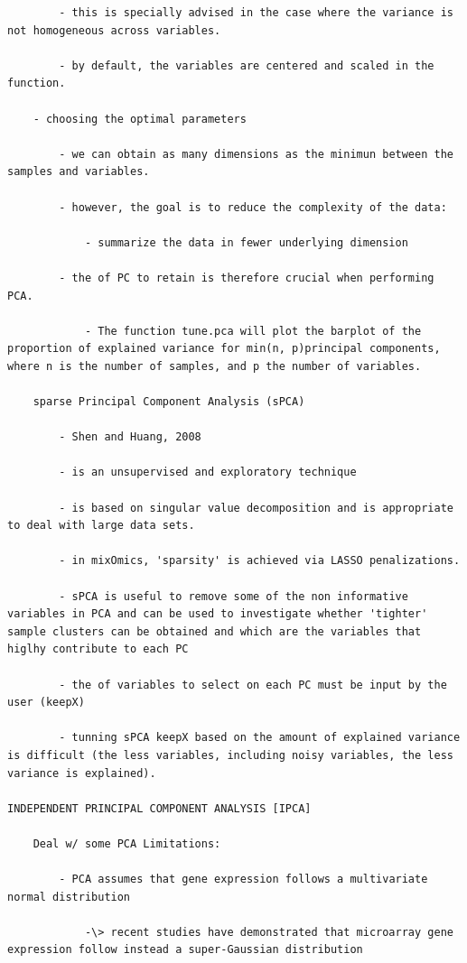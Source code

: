 \documentclass[
]{book}
\begin{document}
\begin{verbatim}
        - this is specially advised in the case where the variance is not homogeneous across variables.

        - by default, the variables are centered and scaled in the function.

    - choosing the optimal parameters

        - we can obtain as many dimensions as the minimun between the samples and variables.

        - however, the goal is to reduce the complexity of the data:

            - summarize the data in fewer underlying dimension

        - the of PC to retain is therefore crucial when performing PCA.

            - The function tune.pca will plot the barplot of the proportion of explained variance for min(n, p)principal components, where n is the number of samples, and p the number of variables.

    sparse Principal Component Analysis (sPCA)

        - Shen and Huang, 2008

        - is an unsupervised and exploratory technique

        - is based on singular value decomposition and is appropriate to deal with large data sets.

        - in mixOmics, 'sparsity' is achieved via LASSO penalizations.

        - sPCA is useful to remove some of the non informative variables in PCA and can be used to investigate whether 'tighter' sample clusters can be obtained and which are the variables that higlhy contribute to each PC

        - the of variables to select on each PC must be input by the user (keepX)

        - tunning sPCA keepX based on the amount of explained variance is difficult (the less variables, including noisy variables, the less variance is explained).

INDEPENDENT PRINCIPAL COMPONENT ANALYSIS [IPCA]

    Deal w/ some PCA Limitations:

        - PCA assumes that gene expression follows a multivariate normal distribution

            -\> recent studies have demonstrated that microarray gene expression follow instead a super-Gaussian distribution


\end{verbatim}
\end{document}
